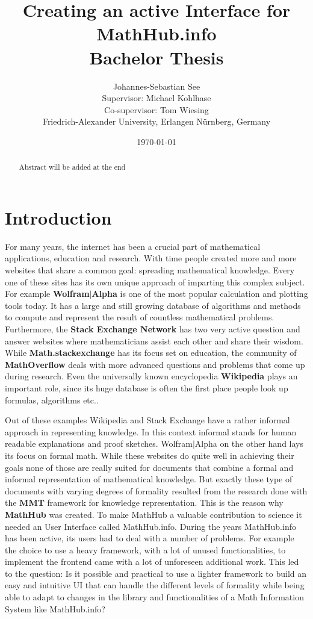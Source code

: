 \documentclass[11pt,a4paper]{article}
\title{Creating an active Interface for MathHub.info\\ \vspace{2 mm} Bachelor Thesis}
\author{Johannes-Sebastian See\\Supervisor: Michael Kohlhase\\Co-supervisor: Tom Wiesing\\Friedrich-Alexander University, Erlangen Nürnberg, Germany}
\date{\today}
\begin{document}
\begin{titlepage}
\maketitle
\begin{abstract}
Abstract will be added at the end
\end{abstract}

\end{titlepage}

\tableofcontents
\pagebreak
\section{Introduction}
For many years, the internet has been a crucial part of mathematical applications, education and research. 
With time people created more and more websites that share a common goal: spreading mathematical knowledge.
Every one of these sites has its own unique approach of imparting this complex subject.
For example \textbf{Wolfram$|$Alpha} \cite{wolfram} is one of the most popular calculation and plotting tools today.
It has a large and still growing database of algorithms and methods to compute and represent the result of countless mathematical problems.
Furthermore, the \textbf{Stack Exchange Network} has two very active question and answer websites where mathematicians assist each other and share their wisdom.
While \textbf{Math.stackexchange} has its focus set on education, the community of \textbf{MathOverflow} deals with more advanced questions and problems that come up during research.
Even the universally known encyclopedia \textbf{Wikipedia} plays an important role, since its huge database is often the first place people look up formulas, algorithms etc..

Out of these examples Wikipedia and Stack Exchange have a rather informal approach in representing knowledge.
In this context informal stands for human readable explanations and proof sketches.
Wolfram$|$Alpha on the other hand lays its focus on formal math.
While these websites do quite well in achieving their goals none of those are really suited for documents that combine a formal and informal representation of mathematical knowledge.
But exactly these type of documents with varying degrees of formality resulted from the research done with the \textbf{MMT} framework for knowledge representation.
This is the reason why \textbf{MathHub}\cite{MathHub} was created.
To make MathHub a valuable contribution to science it needed an User Interface called MathHub.info.
During the years MathHub.info has been active, its users had to deal with a number of problems.
For example the choice to use a heavy framework, with a lot of unused functionalities, to implement the frontend came with a lot of unforeseen additional work.
This led to the question: Is it possible and practical to use a lighter framework to build an easy and intuitive UI that can handle the different levels of formality while being able to adapt to changes in the library and functionalities of a Math Information System like MathHub.info?
\end{document}

